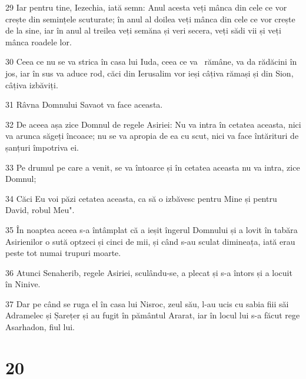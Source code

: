\par 29 Iar pentru tine, Iezechia, iată semn: Anul acesta veți mânca din cele ce vor crește din semințele scuturate; în anul al doilea veți mânca din cele ce vor crește de la sine, iar în anul al treilea veți semăna și veri secera, veți sădi vii și veți mânca roadele lor.
\par 30 Ceea ce nu se va strica în casa lui Iuda, ceea ce va  rămâne, va da rădăcini în jos, iar în sus va aduce rod, căci din Ierusalim vor ieși câțiva rămași și din Sion, câțiva izbăviți.
\par 31 Râvna Domnului Savaot va face aceasta.
\par 32 De aceea așa zice Domnul de regele Asiriei: Nu va intra în cetatea aceasta, nici va arunca săgeți încoace; nu se va apropia de ea cu scut, nici va face întărituri de șanțuri împotriva ei.
\par 33 Pe drumul pe care a venit, se va întoarce și în cetatea aceasta nu va intra, zice Domnul;
\par 34 Căci Eu voi păzi cetatea aceasta, ca să o izbăvesc pentru Mine și pentru David, robul Meu".
\par 35 În noaptea aceea s-a întâmplat că a ieșit îngerul Domnului și a lovit în tabăra Asirienilor o sută optzeci și cinci de mii, și când s-au sculat dimineața, iată erau peste tot numai trupuri moarte.
\par 36 Atunci Senaherib, regele Asiriei, sculându-se, a plecat și s-a întors și a locuit în Ninive.
\par 37 Dar pe când se ruga el în casa lui Nisroc, zeul său, l-au ucis cu sabia fiii săi Adramelec și Șarețer și au fugit în pământul Ararat, iar în locul lui s-a făcut rege Asarhadon, fiul lui.

\chapter{20}

